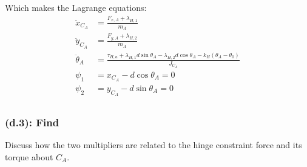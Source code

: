 \documentclass[titlepage]{article}
\begin{document}
\newpage

\begin{mdframed}[linewidth=1pt, innertopmargin=10pt, innerbottommargin=10pt]
	Which makes the Lagrange equations:
	\begin{equation}
		\begin{split}
			\ddot{x}_{C_A}&=\frac{F_{x,A}+\lambda_{H,1}}{m_A} \\
			\ddot{y}_{C_A}&=\frac{F_{y,A}+\lambda_{H,2}}{m_A} \\
			\ddot{\theta}_A&=\frac{\tau_{H,a}+\lambda_{H,1}d\sin\theta_A-\lambda_{H,2}d\cos\theta_A-k_H\left(\theta_A-\theta_0\right)}{J_{C_A}} \\
			\psi_1&=x_{C_A}-d\cos\theta_A=0 \\
			\psi_2&=y_{C_A}-d\sin\theta_A=0 \\
		\end{split}
		\label{eq:d2anwers}
	\end{equation}
\end{mdframed}

\subsubsection*{(d.3): Find}
Discuss how the two multipliers are related to the hinge constraint force and its torque about $C_A$.\\
\end{document}
